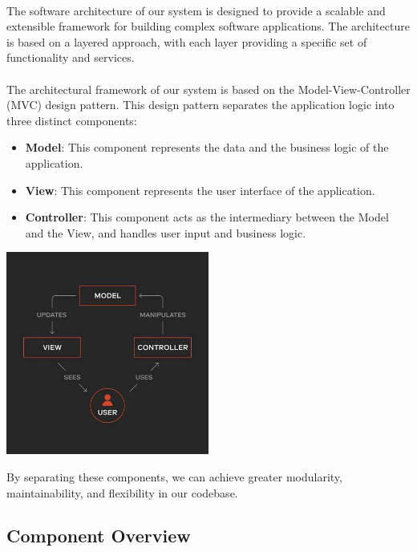 \documentclass{article}
\begin{document}
\paragraph*{}
The software architecture of our system is designed to provide a scalable and extensible framework for building complex software applications. The architecture is based on a layered approach, with each layer providing a specific set of functionality and services.

\paragraph*{}
The architectural framework of our system is based on the Model-View-Controller (MVC) design pattern. This design pattern separates the application logic into three distinct components:

\begin{itemize}
\item \textbf{Model}: This component represents the data and the business logic of the application.
\item \textbf{View}: This component represents the user interface of the application.
\item \textbf{Controller}: This component acts as the intermediary between the Model and the View, and handles user input and business logic.
\end{itemize}

\includegraphics[width=0.5\textwidth]{mvc.jpeg}



By separating these components, we can achieve greater modularity, maintainability, and flexibility in our codebase.

\subsection{Component Overview}
\end{document}
